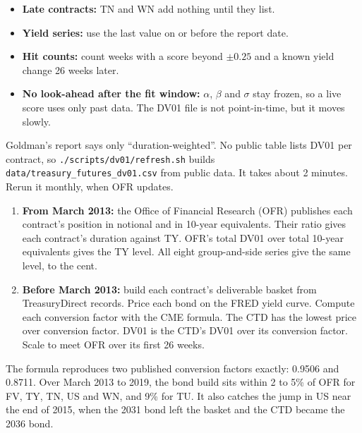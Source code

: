 \documentclass[11pt,a4paper]{article}
\newcommand{\code}[1]{\nolinkurl{#1}}
\newcommand{\sublabel}[1]{\par\vspace{3pt}\needspace{3\baselineskip}{\sffamily\small\bfseries #1}\par\nopagebreak[4]\vspace{1pt}}
\begin{document}
\begin{decision}
\begin{itemize}[leftmargin=*]
\item \textbf{Late contracts:} TN and WN add nothing until they list.
\item \textbf{Yield series:} use the last value on or before the report date.
\item \textbf{Hit counts:} count weeks with a score beyond $\pm 0.25$ and a known yield change 26 weeks later.
\item \textbf{No look-ahead after the fit window:} $\alpha$, $\beta$ and $\sigma$ stay frozen, so a live score uses only past data. The DV01 file is not point-in-time, but it moves slowly.
\end{itemize}
\end{decision}

\sublabel{Build the DV01 file}
Goldman's report says only ``duration-weighted''. No public table lists DV01 per contract, so \code{./scripts/dv01/refresh.sh} builds \code{data/treasury_futures_dv01.csv} from public data. It takes about 2 minutes. Rerun it monthly, when OFR updates.
\begin{enumerate}
\item \textbf{From March 2013:} the Office of Financial Research (OFR) publishes each contract's position in notional and in 10-year equivalents. Their ratio gives each contract's duration against TY. OFR's total DV01 over total 10-year equivalents gives the TY level. All eight group-and-side series give the same level, to the cent.
\item \textbf{Before March 2013:} build each contract's deliverable basket from TreasuryDirect records. Price each bond on the FRED yield curve. Compute each conversion factor with the CME formula. The CTD has the lowest price over conversion factor. DV01 is the CTD's DV01 over its conversion factor. Scale to meet OFR over its first 26 weeks.
\end{enumerate}
The formula reproduces two published conversion factors exactly: 0.9506 and 0.8711. Over March 2013 to 2019, the bond build sits within 2 to 5\% of OFR for FV, TY, TN, US and WN, and 9\% for TU. It also catches the jump in US near the end of 2015, when the 2031 bond left the basket and the CTD became the 2036 bond.
\end{document}
